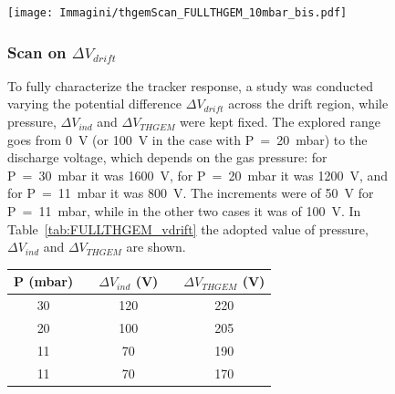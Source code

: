 \documentclass[a4paper, 11 pt]{article}
\newcommand{\Vind}{$\Delta V_{ind}$}
\newcommand{\Vthgem}{$\Delta V_{THGEM}$}
\newcommand{\Vdrift}{$ \Delta V_{drift}$}
\begin{document}
\begin{figure}[htbp]
	\centering
	\texttt{[image: Immagini/thgemScan\_FULLTHGEM\_10mbar\_bis.pdf]}
	\caption{Currents measured during the scan on the voltage \Vthgem{} across the drift region at 10~mbar fixing \Vind{} = 50 V and \Vdrift{} = 400 V.}
	\label{fig:thgem_FULLTHGEM_10mbar_bis}


\clearpage

\subsubsection{Scan on \Vdrift}

To fully characterize the tracker response, a study was conducted varying the potential difference \Vdrift{} across the drift region, while pressure, \Vind{} and \Vthgem{} were kept fixed.
The explored range goes from 0~V (or 100~V in the case with P~=~20~mbar) to the discharge voltage, which depends on the gas pressure: for P~=~30~mbar it was 1600~V, for P~=~20~mbar it was 1200~V, and for P~=~11~mbar it was 800~V.
The increments were of 50~V for P~=~11~mbar, while in the other two cases it was of 100~V.
In Table~\ref{tab:FULLTHGEM_vdrift} the adopted value of pressure, \Vind{} and \Vthgem{} are shown.

\begin{table} [!h]
	\begin{center}
		\renewcommand{\arraystretch}{1.2}
		\begin{tabular} {ccccc}
			P (mbar) & & \Vind{} (V) & & \Vthgem{} (V)\\
			\toprule[0.1em]
			30	& &	120	& &	220 \\
			20	& &	100	& & 205 \\
			11	& & 70	& & 190 \\
			11	& & 70	& & 170 \\
			

\end{tabular}
\end{center}
\end{table}
\end{figure}
\end{document}
